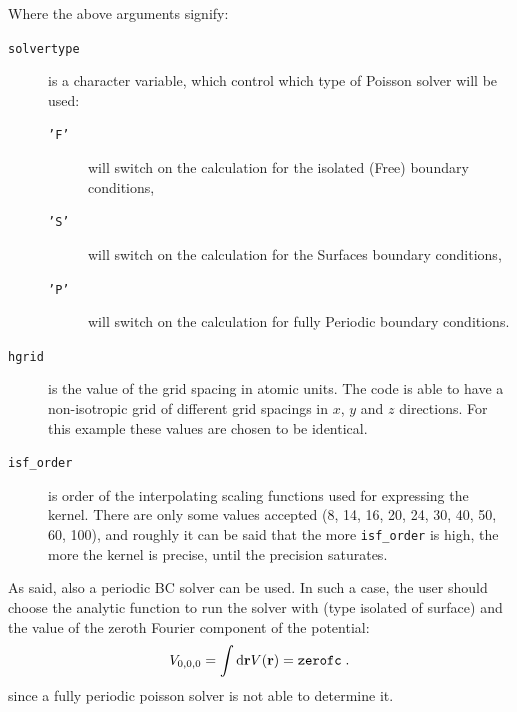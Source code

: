 \documentclass[a4paper]{article}
\newcommand{\dd}{{\rm d}}
\newcommand{\be}{\begin{equation}}
\newcommand{\ee}{\end{equation}}
\begin{document}
Where the above arguments signify:
\begin{description}
 \item[\texttt{solvertype}] is a character variable, which control which type of Poisson solver will be used:
\begin{description}
 \item[\texttt{'F'}] will switch on the calculation for the isolated (Free) boundary conditions,
\item[\texttt{'S'}] will switch on the calculation for the Surfaces boundary conditions,
\item[\texttt{'P'}] will switch on the calculation for fully Periodic boundary conditions.
\end{description}
 \item[\texttt{hgrid}] is the value of the grid spacing in atomic units. The code is able to have a non-isotropic grid of different grid spacings in $x$, $y$ and $z$ directions. For this example these values are chosen to be identical.
\item[\texttt{isf\_order}] is order of the interpolating scaling functions used for expressing the kernel. There are only some values accepted (8, 14, 16, 20, 24, 30, 40, 50, 60, 100), and roughly it can be said that the more \texttt{isf\_order} is high, the more the kernel is precise, until the precision saturates.
\end{description}

As said, also a periodic BC solver can be used. In such a case, the user should choose the analytic function to run the solver with (type isolated of surface) and the value of the zeroth Fourier component of the potential:
\be
V_{0,0,0}=\int \dd \mathbf{r}  V(\mathbf{r}) = \text{\texttt{zerofc}}\;.
\ee
since a fully periodic poisson solver is not able to determine it.
\end{document}
